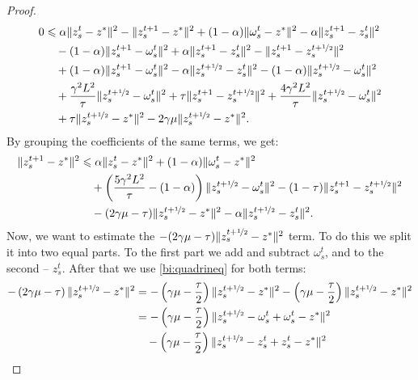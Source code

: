 \documentclass{article}
\begin{document}
\begin{proof}
        \begin{align*}
            0 &\leqslant \alpha \|z_s^t - z^*\|^2 - \|z_s^{t+1} - z^*\|^2 + (1-\alpha)\|\omega_s^t - z^*\|^2 - \alpha \|z_s^{t+1} - z_s^t\|^2 \\
            &\quad - (1-\alpha) \|z_s^{t+1} - \omega_s^t\|^2 + \alpha \|z_s^{t+1} - z_s^t\|^2 - \|z_s^{t+1} - z_s^{t+\nicefrac{1}{2}}\|^2 \\
            & \quad + (1-\alpha)\|z_s^{t+1} - \omega_s^t\|^2 - \alpha \|z_s^{t+\nicefrac{1}{2}} - z_s^t\|^2 - (1-\alpha) \|z_s^{t+\nicefrac{1}{2}} - \omega_s^t\|^2 \\
            & \quad + \frac{\gamma^2 L^2}{\tau}\|z_s^{t+\nicefrac{1}{2}} - \omega_s^t\|^2 + \tau \|z_s^{t+1} - z_s^{t+\nicefrac{1}{2}}\|^2 +\frac{4\gamma^2 L^2}{\tau} \|z_s^{t+\nicefrac{1}{2}} - \omega_s^t\|^2 \\
            & \quad + \tau \|z_s^{t+\nicefrac{1}{2}} - z^*\|^2 - 2\gamma\mu\|z_s^{t+\nicefrac{1}{2}} - z^*\|^2.
        \end{align*}
        By grouping the coefficients of the same terms, we get:
        \begin{align}
        \notag
            \|z_s^{t+1} - z^*\|^2 &\leqslant \alpha \|z_s^t - z^*\|^2 + (1-\alpha)\|\omega_s^t - z^*\|^2 \\
            \notag
            & \quad + \left(\frac{5\gamma^2 L^2}{\tau} - (1-\alpha)\right) \|z_s^{t+\nicefrac{1}{2}} - \omega_s^t\|^2 - (1-\tau)\|z_s^{t+1} - z_s^{t+\nicefrac{1}{2}}\|^2 \\
            \label{t2:ineq2}
            & \quad - (2\gamma\mu - \tau)\|z_s^{t+\nicefrac{1}{2}} - z^*\|^2 - \alpha \|z_s^{t+\nicefrac{1}{2}} - z_s^t\|^2.
        \end{align}
        Now, we want to estimate the $- (2\gamma\mu - \tau)\|z_s^{t+\nicefrac{1}{2}} - z^*\|^2$ term. To do this we split it into two equal parts. To the first part we add and subtract $\omega_s^t$, and to the second -- $z_s^t$. After that we use \eqref{bi:quadrineq} for both terms:
        \begin{align*}
            - \left(2\gamma\mu - \tau\right)\|z_s^{t+\nicefrac{1}{2}} - z^*\|^2 &= - \left(\gamma\mu - \frac{\tau}{2}\right)\|z_s^{t+\nicefrac{1}{2}} - z^*\|^2 - \left(\gamma\mu - \frac{\tau}{2}\right)\|z_s^{t+\nicefrac{1}{2}} - z^*\|^2 \\
            &= - \left(\gamma\mu - \frac{\tau}{2}\right)\|z_s^{t+\nicefrac{1}{2}} - \omega_s^t + \omega_s^t - z^*\|^2 \\
            & \quad - \left(\gamma\mu - \frac{\tau}{2}\right)\|z_s^{t+\nicefrac{1}{2}} - z_s^t + z_s^t - z^*\|^2 \\

\end{align*}
\end{proof}
\end{document}
